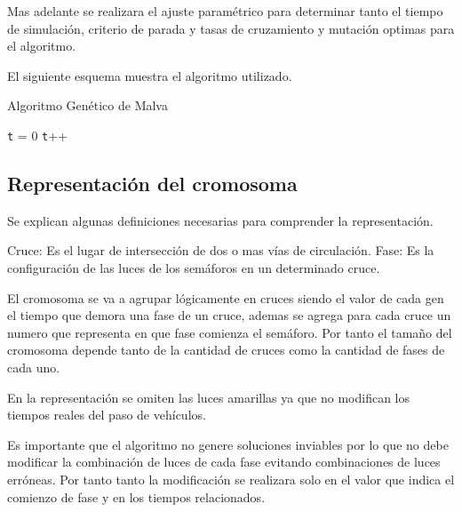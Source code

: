 Mas adelante se realizara el ajuste paramétrico para determinar tanto el tiempo de simulación, criterio de parada y tasas de cruzamiento y mutación optimas para el algoritmo.

El siguiente esquema muestra el algoritmo utilizado. \citep{MalvaAlgGenetico}

 
\begin{algorithm}[H]
	\caption{Algoritmo Genético de Malva}
	\label{alg:algoritmo_genetico_malva}
	\begin{algorithmic} [1] 
		{
			\STATE \texttt{t} = 0
			\STATE \texttt{t}++		
			\ENDWHILE
		}
	\end{algorithmic}

\end{algorithm}




 

\subsection{Representación del cromosoma}

Se explican algunas definiciones necesarias para comprender la representación.

Cruce: Es el lugar de intersección de dos o mas vías de circulación.
Fase: Es la configuración de las luces de los semáforos en un determinado cruce.

El  cromosoma  se  va  a  agrupar  lógicamente  en  cruces siendo el valor de cada gen el tiempo que demora una
fase de un cruce, ademas se agrega para cada cruce un numero que representa en que fase comienza el semáforo. 
Por tanto el tamaño del cromosoma depende tanto de la cantidad de cruces como la cantidad de fases de cada uno.

En la representación se omiten las luces amarillas ya que no modifican los tiempos reales del paso de vehículos.
 
Es  importante que el algoritmo no genere soluciones inviables por lo que no debe modificar la combinación de luces de cada fase evitando combinaciones de luces erróneas. Por tanto tanto la modificación se realizara solo en el valor que indica el comienzo de fase y en los tiempos relacionados.

